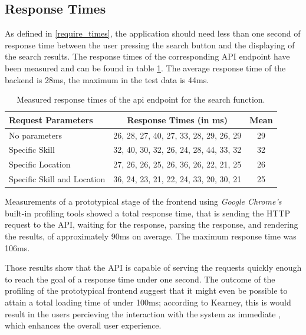 \subsection{Response Times}
\label{resptime}
As defined in \ref{require_times}, the application should need less than one second of response time between the user pressing the search button and the
displaying of the search results. The response times of the corresponding API endpoint have been measured and can be found in table \ref{tab:responsetimes}.
The average response time of the backend is 28ms, the maximum in the test data is 44ms.

\begin{table}[H]
\centering
  \begin{tabular}{l|c|c|}
		Request Parameters                    & Response Times (in ms)                & Mean\\
		\hline
		No parameters               & 26, 28, 27, 40, 27, 33, 28, 29, 26, 29 & 29\\
		Specific Skill              & 32, 40, 30, 32, 26, 24, 28, 44, 33, 32 & 32\\
		Specific Location           & 27, 26, 26, 25, 26, 36, 26, 22, 21, 25 & 26\\
		Specific Skill and Location & 36, 24, 23, 21, 22, 24, 33, 20, 30, 21 & 25\\
  \end{tabular}

\caption[API Response Times]{Measured response times of the api endpoint for the search function.}
\label{tab:responsetimes}
\end{table}

Measurements of a prototypical stage of the frontend using \textit{Google Chrome's} built-in profiling tools showed a total response time, that is sending the HTTP request to the API, waiting for the response, parsing the response, and rendering the results, of approximately 90ms on average. The maximum response time was 106ms.

Those results show that the API is capable of serving the requests quickly enough to reach the goal of a response time under one second. The outcome of the profiling of the prototypical frontend suggest that it might even be possible to attain a total loading time of under 100ms; according to Kearney, this is would result in the users percieving the interaction with the system as immediate \cite{RAIL}, which enhances the overall user experience.

\newpage

